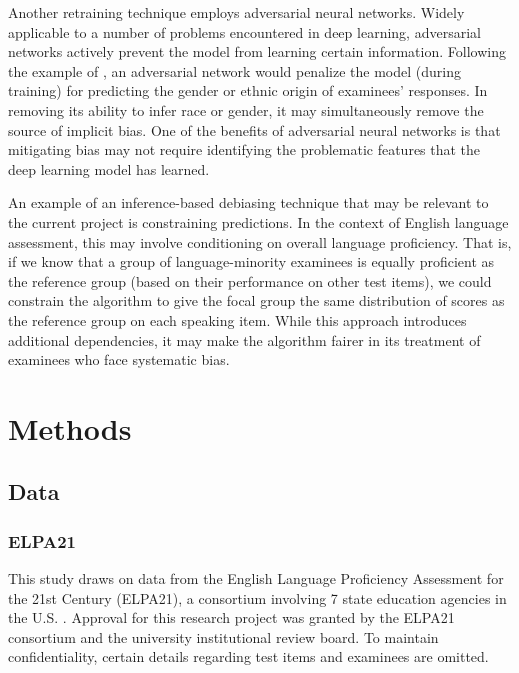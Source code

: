 \documentclass [PhD] {uclathes}
\begin{document}
Another retraining technique employs adversarial neural networks. Widely applicable to a number of problems encountered in deep learning, adversarial networks actively prevent the model from learning certain information. Following the example of \citet{zhang2018mitigating}, an adversarial network would penalize the model (during training) for predicting the gender or ethnic origin of examinees’ responses. In removing its ability to infer race or gender, it may simultaneously remove the source of implicit bias. One of the benefits of adversarial neural networks is that mitigating bias may not require identifying the problematic features that the deep learning model has learned.

An example of an inference-based debiasing technique that may be relevant to the current project is constraining predictions. In the context of English language assessment, this may involve conditioning on overall language proficiency. That is, if we know that a group of language-minority examinees is equally proficient as the reference group (based on their performance on other test items), we could constrain the algorithm to give the focal group the same distribution of scores as the reference group on each speaking item. While this approach introduces additional dependencies, it may make the algorithm fairer in its treatment of examinees who face systematic bias.



\chapter{Methods}
\label{methods}

\section{Data}

\subsection{ELPA21}

This study draws on data from the English Language Proficiency Assessment for the 21st Century (ELPA21), a consortium involving 7 state education agencies in the U.S. \citep{huang2018english}. Approval for this research project was granted by the ELPA21 consortium and the university institutional review board. To maintain confidentiality, certain details regarding test items and examinees are omitted. 
\end{document}
